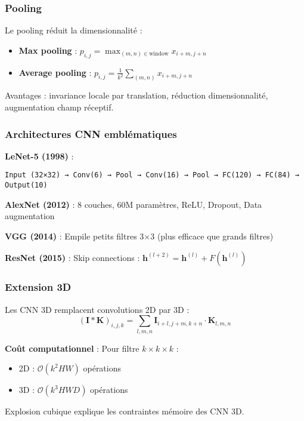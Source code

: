\subsubsection{Pooling}

Le pooling réduit la dimensionnalité :
\begin{itemize}
    \item \textbf{Max pooling} : $p_{i,j} = \max_{(m,n) \in \text{window}} x_{i+m, j+n}$
    \item \textbf{Average pooling} : $p_{i,j} = \frac{1}{k^2}\sum_{(m,n)} x_{i+m, j+n}$
\end{itemize}

Avantages : invariance locale par translation, réduction dimensionnalité, augmentation champ réceptif.

\subsubsection{Architectures CNN emblématiques}

\textbf{LeNet-5 (1998)} :
\begin{verbatim}
Input (32×32) → Conv(6) → Pool → Conv(16) → Pool → FC(120) → FC(84) → Output(10)
\end{verbatim}

\textbf{AlexNet (2012)} :
8 couches, 60M paramètres, ReLU, Dropout, Data augmentation

\textbf{VGG (2014)} :
Empile petits filtres 3×3 (plus efficace que grands filtres)

\textbf{ResNet (2015)} :
Skip connections : $\mathbf{h}^{(l+2)} = \mathbf{h}^{(l)} + F(\mathbf{h}^{(l)})$

\subsubsection{Extension 3D}

Les CNN 3D remplacent convolutions 2D par 3D :
\[
(\mathbf{I} * \mathbf{K})_{i,j,k} = \sum_{l,m,n} \mathbf{I}_{i+l, j+m, k+n} \cdot \mathbf{K}_{l,m,n}
\]

\textbf{Coût computationnel} : Pour filtre $k \times k \times k$ :
\begin{itemize}
    \item 2D : $\mathcal{O}(k^2 HW)$ opérations
    \item 3D : $\mathcal{O}(k^3 HWD)$ opérations
\end{itemize}

Explosion cubique explique les contraintes mémoire des CNN 3D.

